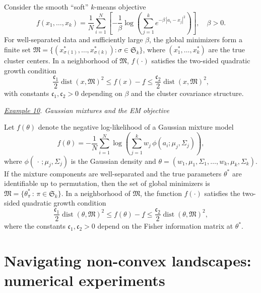 \documentclass[12pt]{amsart}
\numberwithin{equation}{section}
\theoremstyle{plain}
\begin{document}
Consider the smooth ``soft'' $k$-means objective
\begin{equation*}
    f(x_{1}, \dots, x_{k})
    = \frac{1}{N}\sum_{i=1}^{N} \left[-\frac{1}{\beta} \log \left(\sum_{j=1}^{k} e^{-\beta \,|a_{i} - x_{j}|^2}\right)\right],
    \quad \beta>0.
\end{equation*}
For well-separated data and sufficiently large $\beta$, the global minimizers form a finite set  $\mathfrak{M} = \{(x_{\sigma(1)}^{*},\dots, x_{\sigma(k)}^{*}): \sigma \in \mathfrak{S}_{k}\}$,
where $(x_{1}^{*}, \dots, x_{k}^{*})$ are the true cluster centers. 
In a neighborhood of $\mathfrak{M}$, $f(\cdot)$ satisfies the two-sided quadratic growth condition
\begin{equation*}
    \frac{\mathfrak{c}_{1}}{2}\operatorname{dist}(x,\mathfrak{M})^{2}
    \leq f(x) - \underline{f}
    \leq \frac{\mathfrak{c}_{2}}{2}\operatorname{dist}(x,\mathfrak{M})^{2},
\end{equation*}
with constants $\mathfrak{c}_{1},\mathfrak{c}_{2}>0$ depending on $\beta$ and the cluster covariance structure.



\textbullet\; \textit{\underline{Example 10}. Gaussian mixtures and the EM objective}

Let $f(\theta)$ denote the negative log-likelihood of a Gaussian mixture model
\begin{equation*}
    f(\theta)
    = -\frac{1}{N}\sum_{i=1}^{N} \log\left(\sum_{j=1}^{k} w_{j} \, 
    \phi(a_{i};\mu_{j},\Sigma_{j})\right),
\end{equation*}
where $\phi(\,\cdot\,;\mu_{j},\Sigma_{j})$ is the Gaussian density and 
$\theta=(w_{1},\mu_{1},\Sigma_{1},\dots,w_{k},\mu_{k},\Sigma_{k})$. 
If the mixture components are well-separated and the true parameters
$\theta^{*}$ are identifiable up to permutation, then the set of global
minimizers is 
$\mathfrak{M}=\{\theta_{\pi}^{*}\,:\, \pi\in\mathfrak{S}_{k}\}$.
In a neighborhood of $\mathfrak{M}$, the function $f(\cdot)$ satisfies the
two-sided quadratic growth condition
\begin{equation*}
\frac{\mathfrak{c}_{1}}{2}\operatorname{dist}(\theta,\mathfrak{M})^{2}
\leq f(\theta)-\underline{f}
\leq \frac{\mathfrak{c}_{2}}{2}\operatorname{dist}(\theta,\mathfrak{M})^{2},
\end{equation*}
where the constants $\mathfrak{c}_{1},\mathfrak{c}_{2}>0$ depend on the
Fisher information matrix at $\theta^{*}$.

\section{Navigating non-convex landscapes: numerical experiments}\label{sec: numerics}
\end{document}
